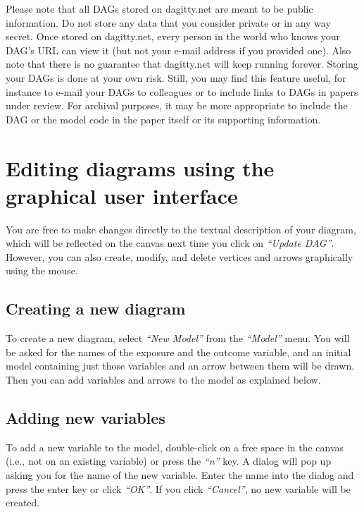 \documentclass[a4paper]{article} %
\newcommand{\action}[1]{\emph{``#1''}}
\begin{document}
Please note that all DAGs stored on dagitty.net are meant to be public information.
Do not store any data that you consider private or in any way secret.
Once stored on dagitty.net, every person in the world who knows your DAG's URL
can view it (but not your e-mail address if you provided one). Also note that there is
no guarantee that dagitty.net will keep running forever. Storing your DAGs is done at
your own risk. Still, you may find this feature useful, for instance to e-mail your DAGs
to colleagues or to include links to DAGs in papers under review. For archival
purposes, it may be more appropriate to include the DAG or the model code in
the paper itself or its supporting information.

\section{Editing diagrams using the graphical user interface} 

\label{sec:diagramediting}

You are free to make changes directly to the textual description of your
diagram, which will be reflected on the canvas next time you click on \action{Update DAG}.
However, you can also create, modify, and delete vertices and arrows graphically
using the mouse.

\subsection{Creating a new diagram}

To create a new diagram, select \action{New Model} from the \action{Model} menu.
You will be asked
for the names of the exposure and the outcome variable, and an initial model containing
just those variables and an arrow between them will be drawn. Then you can
add variables and arrows to the model as explained below. 

\subsection{Adding new variables}

To add a new variable to the model, double-click on a free space in the canvas
(i.e., not on an existing variable) or press the \action{n} key. A dialog will
pop up asking you for the name of the new variable. Enter the name into the dialog
and press the enter key or click \action{OK}. If you click \action{Cancel}, no new 
variable will be created.
\end{document}
